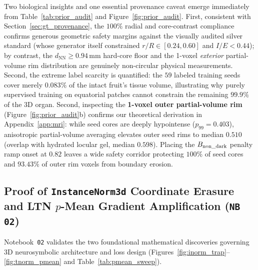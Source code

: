 \documentclass[10pt,a4paper]{article}
\renewcommand{\_}{\origunderscore\allowbreak}
\begin{document}
Two biological insights and one essential provenance caveat emerge immediately from Table~\ref{tab:prior_audit} and Figure~\ref{fig:prior_audit}. First, consistent with Section~\ref{sec:gt_provenance}, the $100\%$ radial and core-contrast compliance confirms generous geometric safety margins against the visually audited silver standard (whose generator itself constrained $r/R \in [0.24, 0.60]$ and $I/E < 0.44$); by contrast, the $d_{\text{NN}} \ge 0.94\,\text{mm}$ hard-core floor and the 1-voxel \emph{exterior} partial-volume rim distribution are genuinely non-circular physical measurements. Second, the extreme label scarcity is quantified: the $59$ labeled training seeds cover merely \textbf{$0.083\%$} of the intact fruit's tissue volume, illustrating why purely supervised training on equatorial patches cannot constrain the remaining $99.9\%$ of the 3D organ. Second, inspecting the \textbf{1-voxel outer partial-volume rim} (Figure~\ref{fig:prior_audit}b) confirms our theoretical derivation in Appendix~\ref{app:mri}: while seed cores are deeply hypointense ($p_{99} = 0.403$), anisotropic partial-volume averaging elevates outer seed rims to median $0.510$ (overlap with hydrated locular gel, median $0.598$). Placing the $B_{\text{non\_dark}}$ penalty ramp onset at $0.82$ leaves a wide safety corridor protecting $100\%$ of seed cores and $93.43\%$ of outer rim voxels from boundary erosion.

\subsection{Proof of \texttt{InstanceNorm3d} Coordinate Erasure and LTN $p$-Mean Gradient Amplification (\texttt{NB 02})}
\label{sec:res_theory}

Notebook~\texttt{02} validates the two foundational mathematical discoveries governing 3D neurosymbolic architecture and loss design (Figures~\ref{fig:inorm_trap}--\ref{fig:tnorm_pmean} and Table~\ref{tab:pmean_sweep}).
\end{document}
